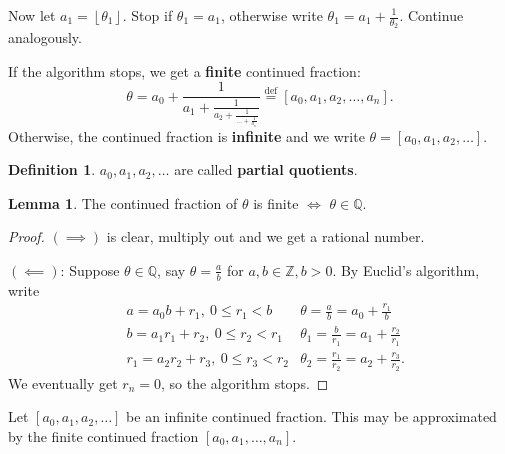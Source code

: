 \documentclass{article}
\theoremstyle{definition}
\newtheorem{lemma}[theorem]{Lemma}
\newtheorem{defn}{Definition}[section]
\begin{document}
Now let $a_1 = \left\lfloor \theta_1 \right\rfloor$. Stop if $\theta_1=a_1$, otherwise write $\theta_1 = a_1 + \frac{1}{\theta_2}$. Continue analogously.
\vspace{1mm}

If the algorithm stops, we get a \textbf{finite} continued fraction:
\[
\theta = a_0 + \frac{1}{a_1+\frac{1}{a_2+\frac{1}{\ldots+\frac{1}{a_n}}}} \stackrel{\text{def}}{=} [a_0,a_1,a_2,\ldots,a_n]. 
\]
Otherwise, the continued fraction is \textbf{infinite} and we write $\theta = [a_0,a_1,a_2,\ldots]$.
\begin{defn}
    $a_0,a_1,a_2,\ldots$ are called \textbf{partial quotients}.     
\end{defn}
\begin{lemma}
    The continued fraction of $\theta$ is finite $\iff$ $\theta \in \mathbb{Q}$.
\end{lemma}
\begin{proof}
    $(\implies)$ is clear, multiply out and we get a rational number.
    \vspace{1mm}
    
    $(\impliedby)$: Suppose $\theta \in \mathbb{Q}$, say $\theta=\frac{a}{b}$ for $a,b \in \mathbb{Z}, b>0$. By Euclid's algorithm, write 
    \begin{align*}
        &a=a_0b+r_1,~ 0\le r_1<b  &\theta=\frac{a}{b}=a_0+\frac{r_1}{b}\\
        &b=a_1r_1+r_2,~ 0\le r_2<r_1 &\theta_1 = \frac{b}{r_1}=a_1+\frac{r_2}{r_1}\\
        &r_1=a_2r_2+r_3, ~0\le r_3<r_2 &\theta_2 = \frac{r_1}{r_2}=a_2+\frac{r_3}{r_2}.
    \end{align*}
    We eventually get $r_n=0$, so the algorithm stops.
\end{proof}
Let $[a_0,a_1,a_2,\ldots]$ be an infinite continued fraction. This may be approximated by the finite continued fraction $[a_0,a_1,\ldots,a_n]$.
\vspace{1mm}
\end{document}
